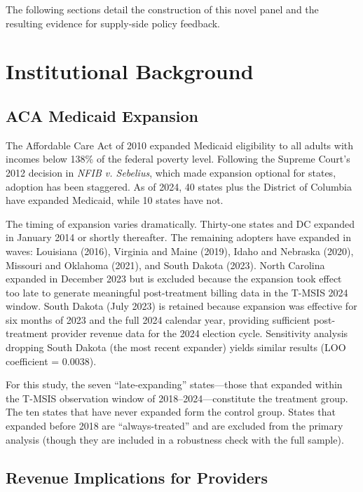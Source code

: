\documentclass[12pt]{article}
\begin{document}
The following sections detail the construction of this novel panel and the resulting evidence for supply-side policy feedback.


\section{Institutional Background}\label{sec:background}

\subsection{ACA Medicaid Expansion}

The Affordable Care Act of 2010 expanded Medicaid eligibility to all adults with incomes below 138\% of the federal poverty level. Following the Supreme Court's 2012 decision in \textit{NFIB v. Sebelius}, which made expansion optional for states, adoption has been staggered. As of 2024, 40 states plus the District of Columbia have expanded Medicaid, while 10 states have not.

The timing of expansion varies dramatically. Thirty-one states and DC expanded in January 2014 or shortly thereafter. The remaining adopters have expanded in waves: Louisiana (2016), Virginia and Maine (2019), Idaho and Nebraska (2020), Missouri and Oklahoma (2021), and South Dakota (2023). North Carolina expanded in December 2023 but is excluded because the expansion took effect too late to generate meaningful post-treatment billing data in the T-MSIS 2024 window. South Dakota (July 2023) is retained because expansion was effective for six months of 2023 and the full 2024 calendar year, providing sufficient post-treatment provider revenue data for the 2024 election cycle. Sensitivity analysis dropping South Dakota (the most recent expander) yields similar results (LOO coefficient = 0.0038).

For this study, the seven ``late-expanding'' states---those that expanded within the T-MSIS observation window of 2018--2024---constitute the treatment group. The ten states that have never expanded form the control group. States that expanded before 2018 are ``always-treated'' and are excluded from the primary analysis (though they are included in a robustness check with the full sample).

\subsection{Revenue Implications for Providers}
\end{document}
